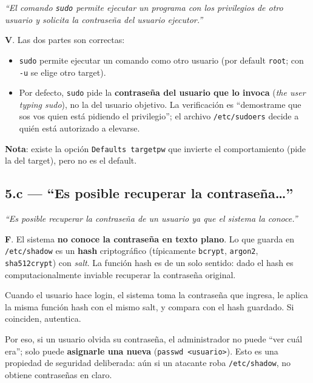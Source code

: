 \documentclass[11pt,a4paper]{article}
\begin{document}
\emph{``El comando \texttt{sudo} permite ejecutar un programa con
los privilegios de otro usuario y solicita la contraseña del usuario
ejecutor.''}

\begin{respuesta}
\textbf{V}. Las dos partes son correctas:

\begin{itemize}[leftmargin=*,nosep]
    \item \texttt{sudo} permite ejecutar un comando como otro usuario
        (por default \texttt{root}; con \texttt{-u} se elige otro
        target).
    \item Por defecto, \texttt{sudo} pide la \textbf{contraseña del
        usuario que lo invoca} (\emph{the user typing sudo}), no la
        del usuario objetivo. La verificación es ``demostrame que sos
        vos quien está pidiendo el privilegio''; el archivo
        \texttt{/etc/sudoers} decide a quién está autorizado a
        elevarse.
\end{itemize}

\textbf{Nota}: existe la opción \texttt{Defaults targetpw} que
invierte el comportamiento (pide la del target), pero no es el
default.
\end{respuesta}

\subsection*{5.c --- ``Es posible recuperar la contraseña\ldots''}

\emph{``Es posible recuperar la contraseña de un usuario ya que el
sistema la conoce.''}

\begin{respuesta}
\textbf{F}. El sistema \textbf{no conoce la contraseña en texto
plano}. Lo que guarda en \texttt{/etc/shadow} es un \textbf{hash}
criptográfico (típicamente \texttt{bcrypt}, \texttt{argon2},
\texttt{sha512crypt}) con \emph{salt}. La función hash es de un solo
sentido: dado el hash es computacionalmente inviable recuperar la
contraseña original.

Cuando el usuario hace login, el sistema toma la contraseña que
ingresa, le aplica la misma función hash con el mismo salt, y
compara con el hash guardado. Si coinciden, autentica.

Por eso, si un usuario olvida su contraseña, el administrador no
puede ``ver cuál era''; solo puede \textbf{asignarle una nueva}
(\texttt{passwd <usuario>}). Esto es una propiedad de seguridad
deliberada: aún si un atacante roba \texttt{/etc/shadow}, no
obtiene contraseñas en claro.
\end{respuesta}
\end{document}
